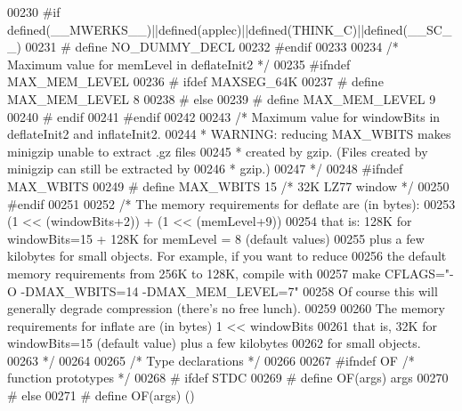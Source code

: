\begin{DoxyCode}
00230 \textcolor{preprocessor}{#if defined(\_\_MWERKS\_\_)||defined(applec)||defined(THINK\_C)||defined(\_\_SC\_\_)}
00231 \textcolor{preprocessor}{#  define NO\_DUMMY\_DECL}
00232 \textcolor{preprocessor}{#endif}
00233 
00234 \textcolor{comment}{/* Maximum value for memLevel in deflateInit2 */}
00235 \textcolor{preprocessor}{#ifndef MAX\_MEM\_LEVEL}
00236 \textcolor{preprocessor}{#  ifdef MAXSEG\_64K}
00237 \textcolor{preprocessor}{#    define MAX\_MEM\_LEVEL 8}
00238 \textcolor{preprocessor}{#  else}
00239 \textcolor{preprocessor}{#    define MAX\_MEM\_LEVEL 9}
00240 \textcolor{preprocessor}{#  endif}
00241 \textcolor{preprocessor}{#endif}
00242 
00243 \textcolor{comment}{/* Maximum value for windowBits in deflateInit2 and inflateInit2.}
00244 \textcolor{comment}{ * WARNING: reducing MAX\_WBITS makes minigzip unable to extract .gz files}
00245 \textcolor{comment}{ * created by gzip. (Files created by minigzip can still be extracted by}
00246 \textcolor{comment}{ * gzip.)}
00247 \textcolor{comment}{ */}
00248 \textcolor{preprocessor}{#ifndef MAX\_WBITS}
00249 \textcolor{preprocessor}{#  define MAX\_WBITS   15 }\textcolor{comment}{/* 32K LZ77 window */}\textcolor{preprocessor}{}
00250 \textcolor{preprocessor}{#endif}
00251 
00252 \textcolor{comment}{/* The memory requirements for deflate are (in bytes):}
00253 \textcolor{comment}{            (1 << (windowBits+2)) +  (1 << (memLevel+9))}
00254 \textcolor{comment}{ that is: 128K for windowBits=15  +  128K for memLevel = 8  (default values)}
00255 \textcolor{comment}{ plus a few kilobytes for small objects. For example, if you want to reduce}
00256 \textcolor{comment}{ the default memory requirements from 256K to 128K, compile with}
00257 \textcolor{comment}{     make CFLAGS="-O -DMAX\_WBITS=14 -DMAX\_MEM\_LEVEL=7"}
00258 \textcolor{comment}{ Of course this will generally degrade compression (there's no free lunch).}
00259 \textcolor{comment}{}
00260 \textcolor{comment}{   The memory requirements for inflate are (in bytes) 1 << windowBits}
00261 \textcolor{comment}{ that is, 32K for windowBits=15 (default value) plus a few kilobytes}
00262 \textcolor{comment}{ for small objects.}
00263 \textcolor{comment}{*/}
00264 
00265                         \textcolor{comment}{/* Type declarations */}
00266 
00267 \textcolor{preprocessor}{#ifndef OF }\textcolor{comment}{/* function prototypes */}\textcolor{preprocessor}{}
00268 \textcolor{preprocessor}{#  ifdef STDC}
00269 \textcolor{preprocessor}{#    define OF(args)  args}
00270 \textcolor{preprocessor}{#  else}
00271 \textcolor{preprocessor}{#    define OF(args)  ()}

\end{DoxyCode}
